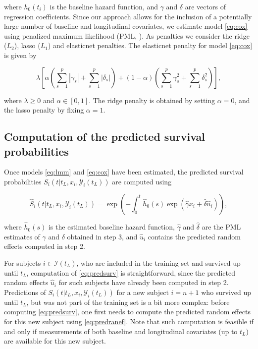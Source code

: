 where \(h_0(t_i)\) is the baseline hazard function, and \(\gamma\) and
\(\delta\) are vectors of regression coefficients. Since our approach
allows for the inclusion of a potentially large number of baseline and
longitudinal covariates, we estimate model \eqref{eq:cox} using
penalized maximum likelihood (PML, \citet{verweij1994}). As penalties we
consider the ridge (\(L_2\)), lasso (\(L_1\)) and elasticnet penalties.
The elasticnet penalty for model \eqref{eq:cox} is given by

\begin{equation}
\lambda  \left[
\alpha \left( \sum_{s=1}^p |\gamma_s| + \sum_{s=1}^p |\delta_s| \right)
+ (1 - \alpha) \left( \sum_{s=1}^p \gamma_s^2 + \sum_{s=1}^p \delta_s^2 \right)
\right],
\label{eq:elasticnet}
\end{equation}

where \(\lambda \geq 0\) and \(\alpha \in [0, 1]\). The ridge penalty is
obtained by setting \(\alpha = 0\), and the lasso penalty by fixing
\(\alpha = 1\).

\subsection{Computation of the predicted survival
probabilities}\label{computation-of-the-predicted-survival-probabilities}

Once models \eqref{eq:lmm} and \eqref{eq:cox} have been estimated, the
predicted survival probabilities
\(S_i(t | t_L, x_i, \mathcal{Y}_i(t_L))\) are computed using

\begin{equation}
\hat{S}_i(t | t_L, x_i, \mathcal{Y}_i(t_L)) =
\exp \left( 
- \int_0^t \hat{h}_0(s) \exp( \hat{\gamma} x_i + \hat{\delta} \hat{u}_i )
\right),
\label{eq:predsurv}
\end{equation}

where \(\hat{h}_0(s)\) is the estimated baseline hazard function,
\(\hat{\gamma}\) and \(\hat{\delta}\) are the PML estimates of
\(\gamma\) and \(\delta\) obtained in step 3, and \(\hat{u}_i\) contains
the predicted random effects computed in step 2.

For subjects \(i \in \mathcal{I}(t_L)\), who are included in the
training set and survived up until \(t_L\), computation of
\eqref{eq:predsurv} is straightforward, since the predicted random
effects \(\hat{u}_i\) for such subjects have already been computed in
step 2. Predictions of \(S_i(t | t_L, x_i, \mathcal{Y}_i(t_L))\) for a
new subject \(i = n + 1\) who survived up until \(t_L\), but was not
part of the training set is a bit more complex: before computing
\eqref{eq:predsurv}, one first needs to compute the predicted random
effects for this new subject using \eqref{eq:predranef}. Note that such
computation is feasible if and only if measurements of both baseline and
longitudinal covariates (up to \(t_L\)) are available for this new
subject.


